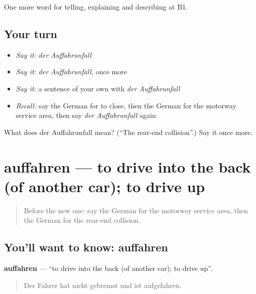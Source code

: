 \begin{grammarlens}[title={What you've built}]
One more word for telling, explaining and describing at B1.
\end{grammarlens}

\subsection*{Your turn}
\begin{itemize}
\raggedright
  \item \emph{Say it:} \emph{der Auffahrunfall}
  \item \emph{Say it:} \emph{der Auffahrunfall}, once more
  \item \emph{Say it:} a sentence of your own with \emph{der Auffahrunfall}
  \item \emph{Recall:} say the German for to close, then the German for the motorway service area, then say \emph{der Auffahrunfall} again
\end{itemize}

\begin{tcolorbox}[breakable,colback=teal!4,colframe=teal!35!black,title={Before you move on}]
What does der Auffahrunfall mean? (\textquotedblleft{}The rear-end collision\textquotedblright{}.) Say it once more.
\end{tcolorbox}
\section[auffahren]{auffahren — to drive into the back (of another car); to drive up}

\label{lesson:GE-C410-auffahren}



\begin{quote}
Before the new one: say the German for the motorway service area, then the German for the rear-end collision.
\end{quote}

\subsection*{You'll want to know: auffahren}
\textbf{auffahren} — \textquotedblleft{}to drive into the back (of another car); to drive up\textquotedblright{}.

\begin{quote}
Der Fahrer hat nicht gebremst und ist aufgefahren.
\end{quote}

